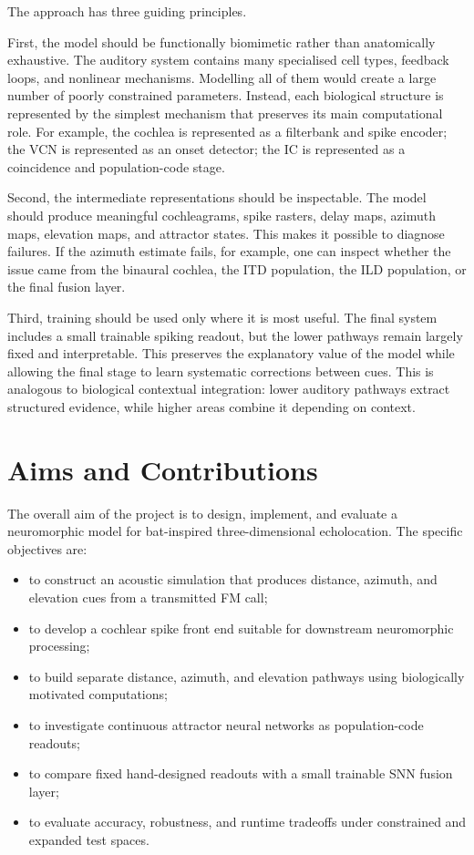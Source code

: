 The approach has three guiding principles.

First, the model should be functionally biomimetic rather than anatomically exhaustive. The auditory system contains many specialised cell types, feedback loops, and nonlinear mechanisms. Modelling all of them would create a large number of poorly constrained parameters. Instead, each biological structure is represented by the simplest mechanism that preserves its main computational role. For example, the cochlea is represented as a filterbank and spike encoder; the VCN is represented as an onset detector; the IC is represented as a coincidence and population-code stage.

Second, the intermediate representations should be inspectable. The model should produce meaningful cochleagrams, spike rasters, delay maps, azimuth maps, elevation maps, and attractor states. This makes it possible to diagnose failures. If the azimuth estimate fails, for example, one can inspect whether the issue came from the binaural cochlea, the ITD population, the ILD population, or the final fusion layer.

Third, training should be used only where it is most useful. The final system includes a small trainable spiking readout, but the lower pathways remain largely fixed and interpretable. This preserves the explanatory value of the model while allowing the final stage to learn systematic corrections between cues. This is analogous to biological contextual integration: lower auditory pathways extract structured evidence, while higher areas combine it depending on context.

\section{Aims and Contributions}

The overall aim of the project is to design, implement, and evaluate a neuromorphic model for bat-inspired three-dimensional echolocation. The specific objectives are:
\begin{itemize}
    \item to construct an acoustic simulation that produces distance, azimuth, and elevation cues from a transmitted FM call;
    \item to develop a cochlear spike front end suitable for downstream neuromorphic processing;
    \item to build separate distance, azimuth, and elevation pathways using biologically motivated computations;
    \item to investigate continuous attractor neural networks as population-code readouts;
    \item to compare fixed hand-designed readouts with a small trainable SNN fusion layer;
    \item to evaluate accuracy, robustness, and runtime tradeoffs under constrained and expanded test spaces.
\end{itemize}

